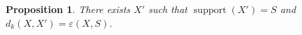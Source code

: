 \documentclass{article}
\newtheorem{proposition}[thm]{Proposition}
\DeclareMathOperator{\support}{support}
\begin{document}
\begin{proposition}
	There exists $X'$ such that $\support(X')=S$ and $d_k(X,X') = \varepsilon(X,S)$.
\end{proposition}
%	



%
%
%
%
%
\end{document}
